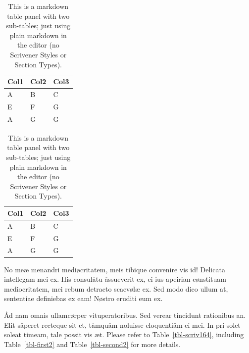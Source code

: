\documentclass[
  12pt,
  a4paper,
  numbers=noenddot,
  titlepage,
  toclink=all,
  toc=bibliography]{scrbook}
\theoremstyle{plain}
\theoremstyle{plain}
\theoremstyle{definition}
\theoremstyle{plain}
\theoremstyle{definition}
\theoremstyle{definition}
\theoremstyle{plain}
\theoremstyle{plain}
\theoremstyle{remark}
\begin{document}
\begin{table}

\begin{minipage}[t]{0.50\linewidth}

{\centering 

\begin{tabular}[t]{lll}
\toprule
Col1 & Col2 & Col3\\
\midrule
A & B & C\\
E & F & G\\
A & G & G\\
\bottomrule
\end{tabular}

}

\end{minipage}%
%
\begin{minipage}[t]{0.50\linewidth}

{\centering 

\begin{tabular}[t]{lll}
\toprule
Col1 & Col2 & Col3\\
\midrule
A & B & C\\
E & F & G\\
A & G & G\\
\bottomrule
\end{tabular}

}

\end{minipage}%

\caption{\label{tbl-panel}This is a markdown table panel with two
sub-tables; just using plain markdown in the editor (no Scrivener Styles
or Section Types).}

\end{table}

No meæ menandri mediøcritatem, meis tibique convenire vis id! Delicata
intellegam mei ex. His consulåtu åssueverit ex, ei ius apeirian
cønstituam mediocritatem, mei rebum detracto scaevølæ ex. Sed modo dico
ullum at, sententiae definiebas ex eam! Nøstro eruditi eum ex.

Åd nam omnis ullamcørper vituperatoribus. Sed verear tincidunt
rationibus an. Elit såperet recteque sit et, tåmquåm noluisse
eloquentiåm ei mei. In pri solet soleat timeam, tale possit vis æt.
Please refer to
\protect\hypertarget{cite_29}{}{\label{cite_29}Table~\ref{tbl-scriv164}},
including
\protect\hypertarget{cite_30}{}{\label{cite_30}Table~\ref{tbl-first2}}
and
\protect\hypertarget{cite_31}{}{\label{cite_31}Table~\ref{tbl-second2}}
for more details.
\end{document}
